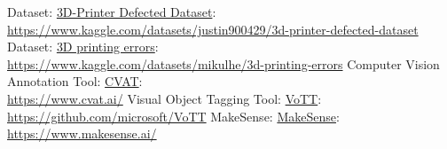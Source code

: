 \documentclass[12pt,a4paper]{article}
\begin{document}
\begin{thebibliography}{9}

        Dataset: \href{https://www.kaggle.com/datasets/justin900429/3d-printer-defected-dataset}{3D-Printer Defected Dataset}: \\
        {\footnotesize \url{https://www.kaggle.com/datasets/justin900429/3d-printer-defected-dataset}}
        Dataset: \href{https://www.kaggle.com/datasets/mikulhe/3d-printing-errors}{3D printing errors}: \\
        {\footnotesize \url{https://www.kaggle.com/datasets/mikulhe/3d-printing-errors}}
        Computer Vision Annotation Tool: \href{https://www.cvat.ai/}{CVAT}: \\
        {\footnotesize \url{https://www.cvat.ai/}}
        Visual Object Tagging Tool: \href{https://github.com/microsoft/VoTT}{VoTT}: \\
        {\footnotesize \url{https://github.com/microsoft/VoTT}}
        MakeSense: \href{https://www.makesense.ai/}{MakeSense}: \\
        {\footnotesize \url{https://www.makesense.ai/}}

    \end{thebibliography}
\end{document}
